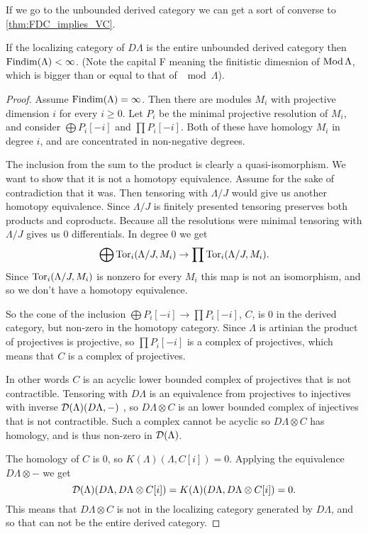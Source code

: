 
If we go to the unbounded derived category we can get a sort of converse to \cref{thm:FDC_implies_VC}.

\begin{theorem}\cite[Theorem~4.3]{Rick19}\label{thm:injectives_generate_implies_FDC}
	If the localizing category of $D\Lambda$ is the entire unbounded derived category then $\operatorname{Findim}(\Lambda) < \infty$. (Note the capital F meaning the finitistic dimesnion of $\operatorname{Mod}\Lambda$, which is bigger than or equal to that of $\mod\Lambda$).
	
	\begin{proof}
		Assume $\operatorname{Findim}(\Lambda) = \infty$. Then there are modules $M_i$ with projective dimension $i$ for every $i \geq 0$. Let $P_i$ be the minimal projective resolution of $M_i$, and consider $\bigoplus P_i[-i]$ and $\prod P_i[-i]$. Both of these have homology $M_i$ in degree $i$, and are concentrated in non-negative degrees.
		
		The inclusion from the sum to the product is clearly a quasi-isomorphism. We want to show that it is not a homotopy equivalence. Assume for the sake of contradiction that it was. Then tensoring with $\Lambda/J$ would give us another homotopy equivalence. Since $\Lambda/J$ is finitely presented tensoring preserves both products and coproducts. Because all the resolutions were minimal tensoring with $\Lambda/J$ gives us 0 differentials. In degree 0 we get $$\bigoplus \operatorname{Tor}_i(\Lambda/J, M_i) \to \prod \operatorname{Tor}_i(\Lambda/J, M_i) .$$
		Since $\operatorname{Tor}_i(\Lambda/J, M_i)$ is nonzero for every $M_i$ this map is not an isomorphism, and so we don't have a homotopy equivalence.
		
		So the cone of the inclusion $\bigoplus P_i[-i] \to \prod P_i[-i]$, $C$, is 0 in the derived category, but non-zero in the homotopy category. Since $\Lambda$ is artinian the product of projectives is projective\cite[Theorem~3.3]{Chase60}, so $\prod P_i[-i]$ is a complex of projectives, which means that $C$ is a complex of projectives. 
		
		In other words $C$ is an acyclic lower bounded complex of projectives that is not contractible. Tensoring with $D\Lambda$ is an equivalence from projectives to injectives with inverse $\operatorname{\mathcal{D}}(\Lambda)(D\Lambda, -)$ , so $D\Lambda \otimes C$ is an lower bounded complex of injectives that is not contractible. Such a complex cannot be acyclic so $D\Lambda \otimes C$ has homology, and is thus non-zero in $\operatorname{\mathcal{D}}(\Lambda)$.
		
		The homology of $C$ is 0, so $K(\Lambda)(\Lambda, C[i]) = 0$. Applying the equivalence $D\Lambda \otimes -$ we get $$\operatorname{\mathcal{D}}(\Lambda)(D\Lambda, D\Lambda \otimes C [i])=K(\Lambda)(D\Lambda, D\Lambda \otimes C [i])=0.$$ This means that $D\Lambda \otimes C$ is not in the localizing category generated by $D\Lambda$, and so that can not be the entire derived category.
	\end{proof}
\end{theorem}


